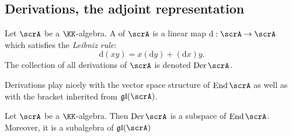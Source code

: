 \documentclass{article}
\DeclareMathOperator{\End}{End}
\DeclareMathOperator{\Der}{Der}
\newcommand{\dd}{\ensuremath{\text{d}}}
\newcommand{\glalg}{\ensuremath{\mathfrak{gl}}}
\begin{document}
\subsection{Derivations, the adjoint representation}

\begin{definition}
    Let $\scrA$ be a $\KK$-algebra.
    A  of $\scrA$ is a linear map $\dd: \scrA \to \scrA$ which satisfies the \textit{Leibniz rule}:
    \[
        \dd(xy)
        =
        x(\dd y) + (\dd x) y.
    \]
    The collection of all derivations of $\scrA$ is denoted $\Der \scrA$.
\end{definition}

Derivations play nicely with the vector space structure of $\End \scrA$ as well as with the bracket inherited from $\glalg(\scrA)$.

\begin{proposition}
    Let $\scrA$ be a $\KK$-algebra.
    Then $\Der \scrA$ is a subspace of $\End \scrA$.
    Moreover, it is a subalgebra of $\glalg(\scrA)$
\end{proposition}
\end{document}
